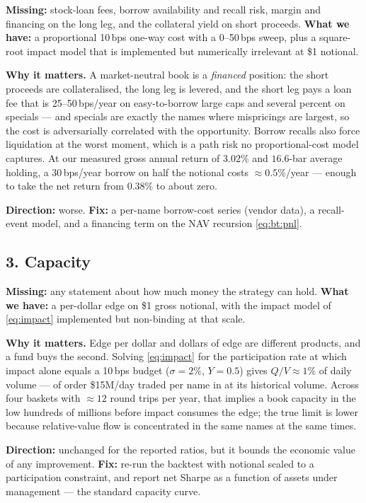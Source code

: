\textbf{Missing:} stock-loan fees, borrow availability and recall risk, margin and
financing on the long leg, and the collateral yield on short proceeds.
\textbf{What we have:} a proportional 10\,bps one-way cost with a 0--50\,bps sweep, plus a
square-root impact model that is implemented but numerically irrelevant at \$1 notional.

\textbf{Why it matters.} A market-neutral book is a \emph{financed} position: the short
proceeds are collateralised, the long leg is levered, and the short leg pays a loan fee that
is 25--50\,bps/year on easy-to-borrow large caps and several percent on specials --- and
specials are exactly the names where mispricings are largest, so the cost is
adversarially correlated with the opportunity. Borrow recalls also force liquidation at the
worst moment, which is a path risk no proportional-cost model captures. At our measured
gross annual return of $3.02\%$ and $16.6$-bar average holding, a 30\,bps/year borrow on
half the notional costs $\approx0.5\%$/year --- enough to take the net return from $0.38\%$
to about zero.

\textbf{Direction:} worse. \textbf{Fix:} a per-name borrow-cost series (vendor data), a
recall-event model, and a financing term on the NAV recursion
\eqref{eq:bt:pnl}.

\subsection{3. Capacity}

\textbf{Missing:} any statement about how much money the strategy can hold.
\textbf{What we have:} a per-dollar edge on \$1 gross notional, with the impact model of
\eqref{eq:impact} implemented but non-binding at that scale.

\textbf{Why it matters.} Edge per dollar and dollars of edge are different products, and a
fund buys the second. Solving \eqref{eq:impact} for the participation rate at which impact
alone equals a 10\,bps budget ($\sigma=2\%$, $Y=0.5$) gives $Q/V\approx1\%$ of daily
volume --- of order \$15M/day traded per name in  at its historical volume.
Across four baskets with $\approx12$ round trips per year, that implies a book capacity in
the low hundreds of millions before impact consumes the edge; the true limit is lower
because relative-value flow is concentrated in the same names at the same times.

\textbf{Direction:} unchanged for the reported ratios, but it bounds the economic value of
any improvement. \textbf{Fix:} re-run the backtest with notional scaled to a participation
constraint, and report net Sharpe as a function of assets under management --- the standard
capacity curve.

